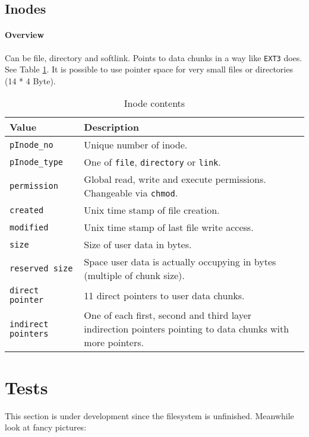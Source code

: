 \subsection{Inodes}
\label{inode}
\paragraph{Overview}
Can be file, directory and softlink. Points to data chunks in a way like \texttt{EXT3} does. See Table \ref{tab:pinode}. It is possible to use pointer space for very small files or directories (14 * 4 Byte).
\begin{table}[htbp]
\caption{Inode contents}
\label{tab:pinode}
\begin{tabularx}{\textwidth}{lp{11cm}p{2.5cm}}
\toprule
Value & Description\\
\midrule
\texttt{pInode\_no} & Unique number of inode. \\
\texttt{pInode\_type} & One of \texttt{file}, \texttt{directory} or \texttt{link}.\\
\texttt{permission} & Global read, write and execute permissions. Changeable via \texttt{chmod}.\\
\texttt{created} & Unix time stamp of file creation.\\
\texttt{modified} & Unix time stamp of last file write access.\\
\texttt{size} & Size of user data in bytes. \\
\texttt{reserved size} & Space user data is actually occupying in bytes (multiple of chunk size).\\
\texttt{direct pointer} & 11 direct pointers to user data chunks.\\
\texttt{indirect pointers} & One of each first, second and third layer indirection pointers pointing to data chunks with more pointers.\\
\bottomrule
\end{tabularx}
\end{table} 

\section{Tests}
\begin{flushleft}
	
\end{flushleft}
This section is under development since the filesystem is unfinished. Meanwhile look at fancy pictures:

